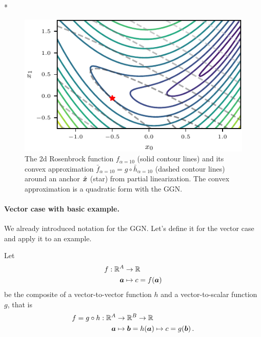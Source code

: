 \switchcolumn[1]*
  \begin{figure}[H]
    \centering
    \includegraphics[width=\linewidth]{../kfs/plots/linearized_rosenbrock.pdf}
    \caption{The 2d Rosenbrock function $f_{\alpha=10}$ (solid contour lines) and its convex approximation $\bar{f}_{\alpha=10} = g \circ \bar{h}_{\alpha=10}$ (dashed contour lines) around an anchor $\hat{{\bm{x}}}$ (star) from partial linearization.
      The convex approximation is a quadratic form with the GGN.}
  \end{figure}\label{fig:2d-rosenbrock}
\switchcolumn[0]

\paragraph{Vector case with basic example.}
We already introduced notation for the GGN.
Let's define it for the vector case and apply it to an example.

\switchcolumn[1]
\switchcolumn[0]

\begin{setup}\label{setup:composite_vector_to_vector_to_scalar_function}
  Let
  \begin{align*}
    f: {\mathbb{R}}^{A} & \to {\mathbb{R}}
    \\
    {\bm{a}}        & \mapsto c = f({\bm{a}})
  \end{align*}
  be the composite of a vector-to-vector function $h$ and a vector-to-scalar function $g$, that is
  \begin{align*}
    f = g \circ h: {\mathbb{R}}^A & \to {\mathbb{R}}^B \to {\mathbb{R}}
    \\
    {\bm{a}}                  & \mapsto {\bm{b}} = h({\bm{a}}) \mapsto c = g({\bm{b}})\,.
  \end{align*}
\end{setup}


